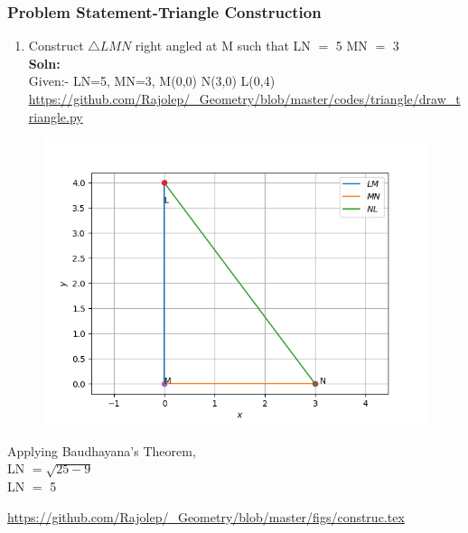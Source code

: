 \begin{frame}
\frametitle{Problem Statement-Triangle Construction}
\begin{enumerate}[label=(\roman*)]
\item Construct $\triangle LMN$ right angled at M such that LN $=$ 5  MN $=$ 3\\
\textbf{Soln:}\\
Given:- LN=5, MN=3, M(0,0) N(3,0) L(0,4) \\
\url{https://github.com/Rajolep/_Geometry/blob/master/codes/triangle/draw_triangle.py}
\end{enumerate}
\begin{figure}
\includegraphics[scale=0.4]{./figs/tricon.png}
\end{figure}
\end{frame}
\begin{frame}
Applying Baudhayana's Theorem,\\
LN $= \sqrt{25-9}$\\
LN $=$ 5
\begin{figure}
\end{figure}
\url{https://github.com/Rajolep/_Geometry/blob/master/figs/construc.tex}
\end{frame}